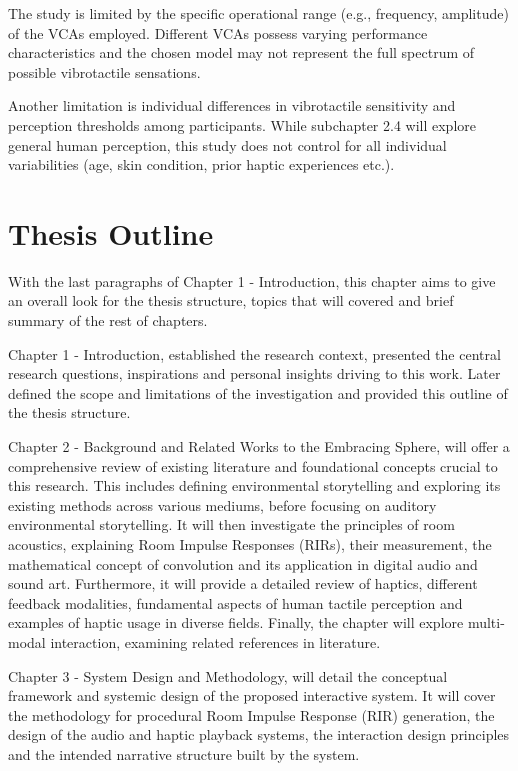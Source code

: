     The study is limited by the specific operational range (e.g., frequency, amplitude) of the VCAs employed. Different VCAs possess varying performance characteristics and the chosen model may not represent the full spectrum of possible vibrotactile sensations.\par

    Another limitation is individual differences in vibrotactile sensitivity and perception thresholds among participants. While subchapter 2.4 will explore general human perception, this study does not control for all individual variabilities (age, skin condition, prior haptic experiences etc.).\par
    \section{Thesis Outline}
    With the last paragraphs of Chapter 1 - Introduction, this chapter aims to give an overall look for the thesis structure, topics that will covered and brief summary of the rest of chapters.\par

    Chapter 1 - Introduction, established the research context, presented the central research questions, inspirations and personal insights driving to this work. Later defined the scope and limitations of the investigation and provided this outline of the thesis structure.\par

    Chapter 2 - Background and Related Works to the Embracing Sphere, will offer a comprehensive review of existing literature and foundational concepts crucial to this research. This includes defining environmental storytelling and exploring its existing methods across various mediums, before focusing on auditory environmental storytelling. It will then investigate the principles of room acoustics, explaining Room Impulse Responses (RIRs), their measurement, the mathematical concept of convolution and its application in digital audio and sound art. Furthermore, it will provide a detailed review of haptics, different feedback modalities, fundamental aspects of human tactile perception and examples of haptic usage in diverse fields. Finally, the chapter will explore multi-modal interaction, examining related references in literature.\par

    Chapter 3 - System Design and Methodology, will detail the conceptual framework and systemic design of the proposed interactive system. It will cover the methodology for procedural Room Impulse Response (RIR) generation, the design of the audio and haptic playback systems, the interaction design principles and the intended narrative structure built by the system.\par

